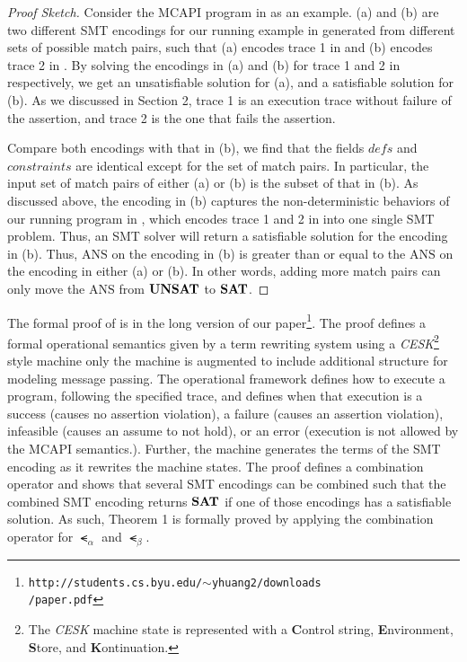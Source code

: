 \begin{proof}[Proof Sketch]
Consider the MCAPI program in  as an example.
(a) and (b) are two different SMT encodings for our running
example in  generated from different sets of
possible match pairs, such that (a) encodes
trace 1 in  and (b) encodes
trace 2 in . By solving the encodings in
(a) and (b) for trace 1 and 2 in
 respectively, we get an unsatisfiable solution for
(a), and a satisfiable solution for
(b). As we discussed in Section 2, trace 1 is an
execution trace without failure of the assertion, and trace 2 is the
one that fails the assertion.

Compare both encodings with that in (b), we find that
the fields $\mathit{defs}$ and $\mathit{constraints}$ are identical
except for the set of match pairs. In particular, the input set of
match pairs of either (a) or (b) is the subset
of that in (b). As discussed above, the encoding in
(b) captures the non-deterministic behaviors of our
running program in , which encodes trace 1 and 2 in
 into one single SMT problem. Thus, an SMT solver
will return a satisfiable solution for the encoding in
(b). Thus, $\mathrm{ANS}$ on the encoding in
(b) is greater than or equal to the $\mathrm{ANS}$ on
the encoding in either (a) or (b). In other
words, adding more match pairs can only move the $\mathrm{ANS}$ from
$\mathrm{\textbf{UNSAT}}$ to $\mathrm{\textbf{SAT}}$.
\end{proof}

The formal proof of  is in the long version of our
paper\footnote{\texttt{http://students.cs.byu.edu/$\sim$yhuang2/downloads\\/paper.pdf}}. The
proof defines a formal operational semantics given by a term rewriting
system using a \textit{CESK}\footnote{The \textit{CESK} machine state
  is represented with a \textbf{C}ontrol string, \textbf{E}nvironment,
  \textbf{S}tore, and \textbf{K}ontinuation.} style machine only the
machine is augmented to include additional structure for modeling
message passing. The operational framework defines how to execute a
program, following the specified trace, and defines when that
execution is a success (causes no assertion violation), a failure
(causes an assertion violation), infeasible (causes an assume to not
hold), or an error (execution is not allowed by the MCAPI
semantics.). Further, the machine generates the terms of the SMT
encoding as it rewrites the machine states. The proof defines a
combination operator and shows that several SMT encodings can be
combined such that the combined SMT encoding returns
$\mathrm{\textbf{SAT}}$ if one of those encodings has a satisfiable
solution.  As such, Theorem 1 is formally proved by applying the
combination operator for $\smt_{\alpha}$ and $\smt_{\beta}$.

